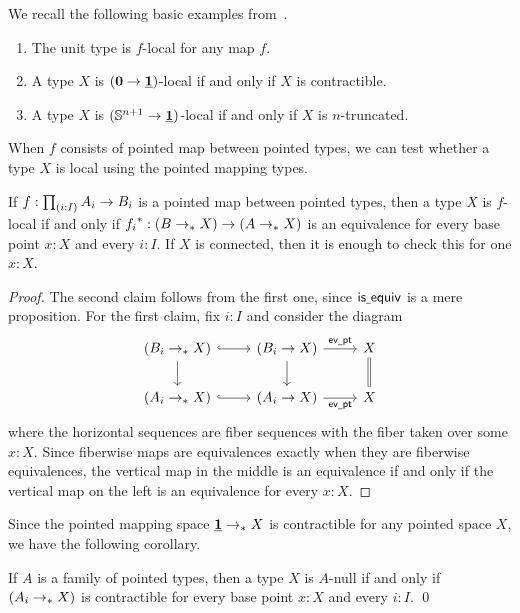 \begin{eg} We recall the following basic examples from~\cite{RijkeShulmanSpitters}.
\begin{enumerate}
\item The unit type is $f$-local for any map $f$.
\item A type $X$ is $(\mathbf{0}\to\underline{\mathbf{1}})$-local if and only if $X$ is contractible.
\item A type $X$ is $(\mathbb{S}^{n+1}\to\underline{\mathbf{1}})$-local if and only if $X$ is $n$-truncated.
\end{enumerate}
\end{eg}

When $f$ consists of pointed map between pointed types, we can test whether
a type $X$ is local using the pointed mapping types.

\begin{lem}\label{lemma:pointed}
    If $f : \prd{i:I} A_i \to B_i$ is a pointed map between pointed types,
    then a type $X$ is $f$-local if and only if
    ${f_i}^\ast : (B \to_{\ast} X) \to (A \to_{\ast} X)$ is an equivalence
    for every base point $x : X$ and every $i : I$.
    If $X$ is connected, then it is enough to check this for one $x : X$.
\end{lem}

\begin{proof}
    The second claim follows from the first one, since
    $\mathsf{is\underline{\ }{}equiv}$ is a mere proposition.
    For the first claim, fix $i : I$ and consider the diagram
\begin{equation*}
\begin{tikzcd}
(B_i \to_\ast X) \arrow[d] \arrow[r,hookrightarrow] & (B_i\to X) \arrow[d] \arrow[r,"\evpt"] & X \arrow[d,equals] \\
(A_i \to_\ast X) \arrow[r,hookrightarrow] & (A_i \to X) \arrow[r,swap,"\evpt"] & X
\end{tikzcd}
\end{equation*}
    where the horizontal sequences are fiber sequences with the fiber taken over
    some $x : X$. Since fiberwise maps are equivalences exactly when they are fiberwise
    equivalences, the vertical map in the middle is an equivalence if and
    only if the vertical map on the left is an equivalence for every $x : X$.
\end{proof}

Since the pointed mapping space $\underline{\mathbf{1}}\to_\ast X$ is contractible for any pointed space $X$, we have the following corollary.

\begin{cor}\label{cor:pointed_null}
If $A$ is a family of pointed types, then a type $X$ is $A$-null
if and only if $(A_i \to_{\ast} X)$ is contractible
for every base point $x : X$ and every $i : I$. \qed
\end{cor}

